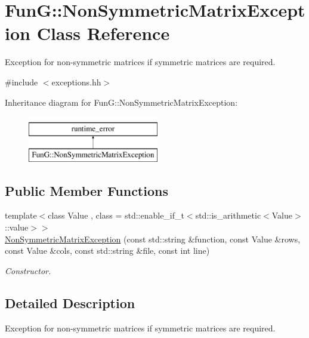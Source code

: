 \hypertarget{classFunG_1_1NonSymmetricMatrixException}{}\section{Fun\+G\+:\+:Non\+Symmetric\+Matrix\+Exception Class Reference}
\label{classFunG_1_1NonSymmetricMatrixException}


Exception for non-\/symmetric matrices if symmetric matrices are required.  




{\ttfamily \#include $<$exceptions.\+hh$>$}

Inheritance diagram for Fun\+G\+:\+:Non\+Symmetric\+Matrix\+Exception\+:\begin{figure}[H]
\begin{center}
\leavevmode
\includegraphics[height=2.000000cm]{classFunG_1_1NonSymmetricMatrixException}
\end{center}
\end{figure}
\subsection*{Public Member Functions}
\begin{DoxyCompactItemize}
\item 
{\footnotesize template$<$class Value , class  = std\+::enable\+\_\+if\+\_\+t$<$std\+::is\+\_\+arithmetic$<$\+Value$>$\+::value$>$$>$ }\\\hyperlink{classFunG_1_1NonSymmetricMatrixException_a1c11fd643c37e5fa2145aba2cc7ab09d}{Non\+Symmetric\+Matrix\+Exception} (const std\+::string \&function, const Value \&rows, const Value \&cols, const std\+::string \&file, const int line)
\begin{DoxyCompactList}\small\item\em Constructor. \end{DoxyCompactList}\end{DoxyCompactItemize}


\subsection{Detailed Description}
Exception for non-\/symmetric matrices if symmetric matrices are required. 

